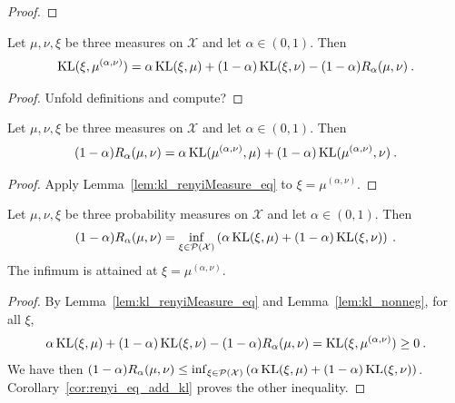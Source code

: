 \begin{proof}%
{}

\end{proof}

\begin{lemma}
  \label{lem:kl_renyiMeasure_eq}
  Let $\mu, \nu, \xi$ be three measures on $\mathcal X$ and let $\alpha \in (0, 1)$. Then
  \begin{align*}
  \operatorname{KL}(\xi, \mu^{(\alpha, \nu)}) = \alpha \operatorname{KL}(\xi, \mu) + (1 - \alpha)\operatorname{KL}(\xi, \nu) - (1 - \alpha) R_\alpha(\mu, \nu) \: .
  \end{align*}
\end{lemma}

\begin{proof}
Unfold definitions and compute?
\end{proof}

\begin{corollary}
  \label{cor:renyi_eq_add_kl}
  Let $\mu, \nu, \xi$ be three measures on $\mathcal X$ and let $\alpha \in (0, 1)$. Then
  \begin{align*}
  (1 - \alpha) R_\alpha(\mu, \nu) = \alpha \operatorname{KL}(\mu^{(\alpha, \nu)}, \mu) + (1 - \alpha)\operatorname{KL}(\mu^{(\alpha, \nu)}, \nu) \: .
  \end{align*}
\end{corollary}

\begin{proof}
Apply Lemma~\ref{lem:kl_renyiMeasure_eq} to $\xi = \mu^{(\alpha, \nu)}$.
\end{proof}

\begin{lemma}
  \label{lem:renyi_eq_inf_add_kl}
  Let $\mu, \nu, \xi$ be three probability measures on $\mathcal X$ and let $\alpha \in (0, 1)$. Then
  \begin{align*}
  (1 - \alpha) R_\alpha(\mu, \nu) = \inf_{\xi \in \mathcal P(\mathcal X)}\left( \alpha \operatorname{KL}(\xi, \mu) + (1 - \alpha)\operatorname{KL}(\xi, \nu) \right) \: .
  \end{align*}
  The infimum is attained at $\xi = \mu^{(\alpha, \nu)}$.
\end{lemma}

\begin{proof}
By Lemma~\ref{lem:kl_renyiMeasure_eq} and Lemma~\ref{lem:kl_nonneg}, for all $\xi$,
\begin{align*}
\alpha \operatorname{KL}(\xi, \mu) + (1 - \alpha)\operatorname{KL}(\xi, \nu) - (1 - \alpha) R_\alpha(\mu, \nu)
= \operatorname{KL}(\xi, \mu^{(\alpha, \nu)})
\ge 0 \: .
\end{align*}
We have then $(1 - \alpha) R_\alpha(\mu, \nu) \le \inf_{\xi \in \mathcal P(\mathcal X)}\left( \alpha \operatorname{KL}(\xi, \mu) + (1 - \alpha)\operatorname{KL}(\xi, \nu) \right)$.
Corollary~\ref{cor:renyi_eq_add_kl} proves the other inequality.
\end{proof}

